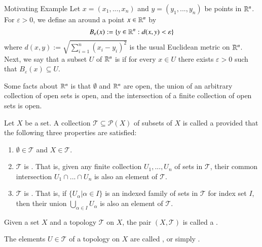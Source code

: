 \documentclass[12pt, a4paper, twoside, openright, titlepage]{book}
\begin{document}
\begin{cust*}[separator sign={}]{Motivating Example}{}
    Let $x = (x_1,...,x_n)$ and $y=(y_1,...,y_n)$ be points in $\mathbb R^n$. For $\varepsilon > 0$, we define an  around a point $x \in \mathbb R^n$ by \begin{equation*}
        B_{\varepsilon}(x) := \{y \in \mathbb R^n:d(x,y) < \varepsilon\}
    \end{equation*}
    where $d(x,y):=\sqrt{\sum_{i=1}^n(x_i-y_i)^2}$ is the usual Euclidean metric on $\mathbb R^n$. Next, we say that a subset $U$ of $\mathbb R^n$ is  if for every $x \in U$ there exists $\varepsilon > 0$ such that $B_{\varepsilon}(x) \subseteq U$. 

    Some facts about $\mathbb R^n$ is that $\emptyset$ and $\mathbb R^n$ are open, the union of an arbitrary collection of open sets is open, and the intersection of a finite collection of open sets is open. 
\end{cust*}

\begin{defn}{}{}
    Let $X$ be a set. A collection $\mathcal{T} \subseteq \mathcal{P}(X)$ of subsets of $X$ is called a  provided that the following three properties are satisfied: \begin{enumerate}
        \item $\emptyset \in \mathcal{T}$ and $X \in \mathcal{T}$.
        \item $\mathcal{T}$ is . That is, given any finite collection $U_1,...,U_n$ of sets in $\mathcal{T}$, their common intersection $U_1\cap ...\cap U_n$ is also an element of $\mathcal{T}$.
        \item $\mathcal{T}$ is . That is, if $\{U_{\alpha}\vert\alpha\in I\}$ is an indexed family of sets in $\mathcal{T}$ for index set $I$, then their union $\bigcup_{\alpha \in I}U_{\alpha}$ is also an element of $\mathcal{T}$.
    \end{enumerate}
    Given a set $X$ and a topology $\mathcal{T}$ on $X$, the pair $(X,\mathcal{T})$ is called a . 


    The elements $U \in \mathcal{T}$ of a topology on $X$ are called , or simply .
\end{defn}
\end{document}
